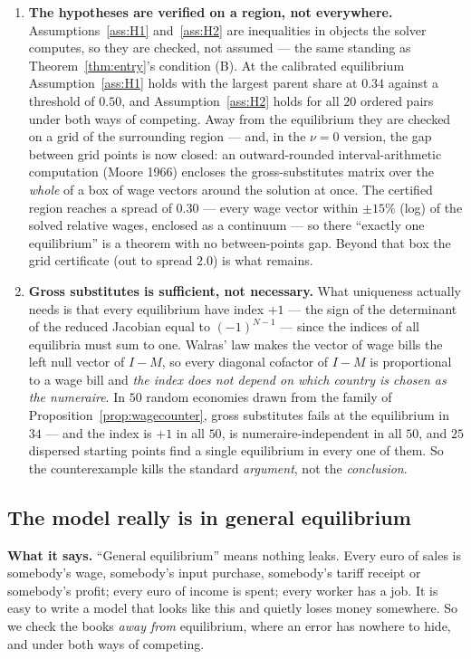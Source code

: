 \documentclass[11pt]{article}
\newcommand{\says}[1]{\smallskip\noindent\textbf{What it says.} #1\smallskip}
\theoremstyle{plain}
\theoremstyle{remark}
\theoremstyle{definition}
\begin{document}
\begin{enumerate}
\item \textbf{The hypotheses are verified on a region, not everywhere.}
Assumptions~\ref{ass:H1} and~\ref{ass:H2} are inequalities in objects the solver
computes, so they are checked, not assumed --- the same standing as
Theorem~\ref{thm:entry}'s condition (B). At the calibrated equilibrium
Assumption~\ref{ass:H1} holds with the largest parent share at $0.34$ against a
threshold of $0.50$, and Assumption~\ref{ass:H2} holds for all $20$ ordered pairs
under both ways of competing. Away from the equilibrium they are checked on a grid of
the surrounding region --- and, in the $\nu=0$ version, the gap between grid points is
now closed: an outward-rounded interval-arithmetic computation (Moore 1966) encloses the
gross-substitutes matrix over the \emph{whole} of a box of wage vectors around the
solution at once. The certified region reaches a spread of $0.30$ --- every wage
vector within $\pm15\%$ (log) of the solved relative wages, enclosed as a continuum
--- so there ``exactly one equilibrium'' is a theorem with no between-points gap.
Beyond that box the grid certificate (out to spread $2.0$) is what remains.

\item \textbf{Gross substitutes is sufficient, not necessary.} What uniqueness actually
needs is that every equilibrium have index $+1$ --- the sign of the determinant of the
reduced Jacobian equal to $(-1)^{N-1}$ --- since the indices of all equilibria must sum
to one. Walras' law makes the vector of wage bills the left null vector of $I-M$, so
every diagonal cofactor of $I-M$ is proportional to a wage bill and \emph{the index does
not depend on which country is chosen as the numeraire}. In $50$ random economies drawn
from the family of Proposition~\ref{prop:wagecounter}, gross substitutes fails at the
equilibrium in $34$ --- and the index is $+1$ in all $50$, is numeraire-independent in
all $50$, and $25$ dispersed starting points find a single equilibrium in every one of
them. So the counterexample kills the standard \emph{argument}, not the
\emph{conclusion}.
\end{enumerate}

\subsection{The model really is in general equilibrium}
\label{sec:accounting}

\says{``General equilibrium'' means nothing leaks. Every euro of sales is somebody's
wage, somebody's input purchase, somebody's tariff receipt or somebody's profit; every
euro of income is spent; every worker has a job. It is easy to write a model that looks
like this and quietly loses money somewhere. So we check the books \emph{away from}
equilibrium, where an error has nowhere to hide, and under both ways of competing.}
\end{document}
